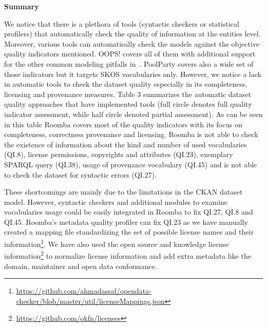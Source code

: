 \noindent

\textbf{Summary}

\indent We notice that there is a plethora of tools (syntactic checkers or statistical profilers) that automatically check the quality of information at the entities level. Moreover, various tools can automatically check the models against the objective quality indicators mentioned. OOPS! covers all of them with additional support for the other common modeling pitfalls in~\cite{Maria:KEOD:13}. PoolParty covers also a wide set of those indicators but it targets SKOS vocabularies only. However, we notice a lack in automatic tools to check the dataset quality especially in its completeness, licensing and provenance measures. Table 3 summarizes the automatic dataset quality approaches that have implemented tools (full circle denotes full quality indicator assessment, while half circle denoted partial assessment). As can be seen in this table Roomba covers most of the quality indicators with its focus on completeness, correctness provenance and licensing. Roomba is not able to check the existence of information about the kind and number of used vocabularies (QI.8), license permissions, copyrights and attributes (QI.23), exemplary SPARQL query (QI.38), usage of provenance vocabulary (QI.45) and is not able to check the dataset for syntactic errors (QI.27).

These shortcomings are mainly due to the limitations in the CKAN dataset model. However, syntactic checkers and additional modules to examine vocabularies usage could be easily integrated in Roomba to fix QI.27, QI.8 and QI.45. Roomba's metadata quality profiler can fix QI.23 as we have manually created a mapping file standardizing the set of possible license names and their information\footnote{\url{https://github.com/ahmadassaf/opendata-checker/blob/master/util/licenseMappings.json}}. We have also used the open source and knowledge license information\footnote{\url{https://github.com/okfn/licenses}} to normalize license information and add extra metadata like the domain, maintainer and open data conformance.



